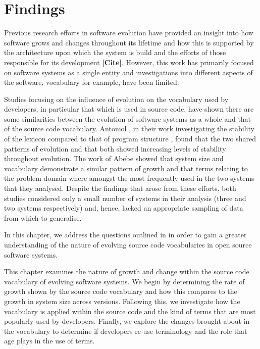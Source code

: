 \chapter{Findings} %
\label{cha:findings}

Previous research efforts in software evolution have provided an insight into how software grows and changes throughout its lifetime and how this is supported by the architecture upon which the system is build and the efforts of those responsible for its development \textbf{[Cite]}. However, this work has primarily focused on software systems as a single entity and investigations into different aspects of the software, vocabulary for example, have been limited.

Studies focusing on the influence of evolution on the vocabulary used by developers, in particular that which is used in source code, have shown there are some similarities between the evolution of software systems as a whole and that of the source code vocabulary. Antoniol \etal, in their work investigating the stability of the lexicon compared to that of program structure \cite{Antoniol07a}, found that the two shared patterns of evolution and that both showed increasing levels of stability throughout evolution. The work of Abebe \etal \cite{Abebe09a} showed that system size and vocabulary demonstrate a similar pattern of growth and that terms relating to the problem domain where amongst the most frequently used in the two systems that they analysed. Despite the findings that arose from these efforts, both studies considered only a small number of systems in their analysis (three and two systems respectively) and, hence, lacked an appropriate sampling of data from which to generalise.

In this chapter, we address the questions outlined in  in order to gain a greater understanding of the nature of evolving source code vocabularies in open source software systems.

This chapter examines the nature of growth and change within the source code vocabulary of evolving software systems. We begin by determining the rate of growth shown by the source code vocabulary and how this compares to the growth in system size across versions. Following this, we investigate how the vocabulary is applied within the source code and the kind of terms that are most popularly used by developers. Finally, we explore the changes brought about in the vocabulary to determine if developers re-use terminology and the role that age plays in the use of terms.

